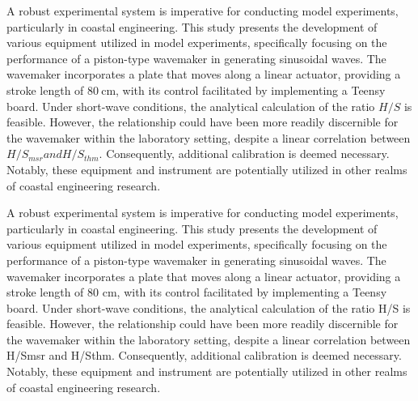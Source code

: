 \begin{abstracts}
{        A robust experimental system is imperative for conducting model experiments, particularly in coastal engineering. This study presents the development of various equipment utilized in model experiments, specifically focusing on the performance of a piston-type wavemaker in generating sinusoidal waves. The wavemaker incorporates a plate that moves along a linear actuator, providing a stroke length of 80$\mathrm{~cm}$, with its control facilitated by implementing a Teensy board. Under short-wave conditions, the analytical calculation of the ratio $H/S$ is feasible. However, the relationship could have been more readily discernible for the wavemaker within the laboratory setting, despite a linear correlation between $H/S_{msr} and H/S_{thm}$. Consequently, additional calibration is deemed necessary. Notably, these equipment and instrument are potentially utilized in other realms of coastal engineering research.
  
	}
\end{abstracts}



A robust experimental system is imperative for conducting model experiments, particularly in coastal engineering. This study presents the development of various equipment utilized in model experiments, specifically focusing on the performance of a piston-type wavemaker in generating sinusoidal waves. The wavemaker incorporates a plate that moves along a linear actuator, providing a stroke length of 80 cm, with its control facilitated by implementing a Teensy board. Under short-wave conditions, the analytical calculation of the ratio H/S is feasible. However, the relationship could have been more readily discernible for the wavemaker within the laboratory setting, despite a linear correlation between H/Smsr and H/Sthm. Consequently, additional calibration is deemed necessary. Notably, these equipment and instrument are potentially utilized in other realms of coastal engineering research.



